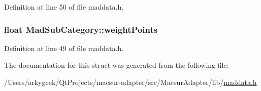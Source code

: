 Definition at line 50 of file maddata.\-h.

\hypertarget{struct_mad_sub_category_a5aa8b532f2decce8a584b7cbb2b0816c}{
\subsubsection[{weight\-Points}]{\setlength{\rightskip}{0pt plus 5cm}float Mad\-Sub\-Category\-::weight\-Points}}\label{struct_mad_sub_category_a5aa8b532f2decce8a584b7cbb2b0816c}


Definition at line 49 of file maddata.\-h.



The documentation for this struct was generated from the following file\-:\begin{DoxyCompactItemize}
\item 
/\-Users/arkygeek/\-Qt\-Projects/macsur-\/adapter/src/\-Macsur\-Adapter/lib/\hyperlink{maddata_8h}{maddata.\-h}\end{DoxyCompactItemize}
